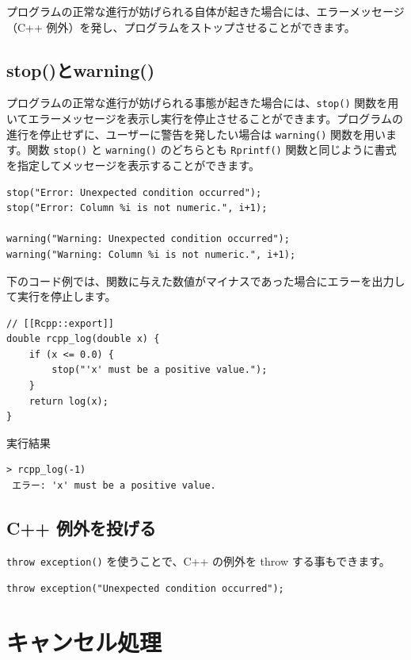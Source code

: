 \documentclass[]{book}
\begin{document}
プログラムの正常な進行が妨げられる自体が起きた場合には、エラーメッセージ（C++ 例外）を発し、プログラムをストップさせることができます。

\hypertarget{stopwarning}{%
\section{stop()とwarning()}\label{stopwarning}}

プログラムの正常な進行が妨げられる事態が起きた場合には、\texttt{stop()} 関数を用いてエラーメッセージを表示し実行を停止させることができます。プログラムの進行を停止せずに、ユーザーに警告を発したい場合は \texttt{warning()} 関数を用います。関数 \texttt{stop()} と \texttt{warning()} のどちらとも \texttt{Rprintf()} 関数と同じように書式を指定してメッセージを表示することができます。

\begin{verbatim}
stop("Error: Unexpected condition occurred");
stop("Error: Column %i is not numeric.", i+1);

warning("Warning: Unexpected condition occurred");
warning("Warning: Column %i is not numeric.", i+1);
\end{verbatim}

下のコード例では、関数に与えた数値がマイナスであった場合にエラーを出力して実行を停止します。

\begin{verbatim}
// [[Rcpp::export]]
double rcpp_log(double x) {
    if (x <= 0.0) {
        stop("'x' must be a positive value.");
    }
    return log(x);
}
\end{verbatim}

実行結果

\begin{verbatim}
> rcpp_log(-1)
 エラー: 'x' must be a positive value.
\end{verbatim}

\hypertarget{c-}{%
\section{C++ 例外を投げる}\label{c-}}

\texttt{throw\ exception()} を使うことで、C++ の例外を throw する事もできます。

\begin{verbatim}
throw exception("Unexpected condition occurred");
\end{verbatim}

\chapter{キャンセル処理}
\end{document}
